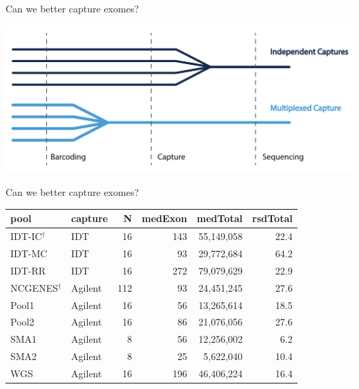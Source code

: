 \documentclass[
  10pt,
  ignorenonframetext,
  m]{beamer}
\begin{document}
\begin{frame}{Can we better capture exomes?}
\protect\hypertarget{can-we-better-capture-exomes}{}

\centering

\includegraphics{images/multiCapture.pdf}

\end{frame}

\begin{frame}{Can we better capture exomes?}
\protect\hypertarget{can-we-better-capture-exomes-1}{}

\centering

\begin{tabular}{llrrrr}
\toprule
pool & capture & N & medExon & medTotal & rsdTotal\\
\midrule
IDT-IC$^\dagger$ & IDT & 16 & 143 & 55,149,058 & 22.4\\
IDT-MC & IDT & 16 & 93 & 29,772,684 & 64.2\\
IDT-RR & IDT & 16 & 272 & 79,079,629 & 22.9\\
NCGENES$^\dagger$ & Agilent & 112 & 93 & 24,451,245 & 27.6\\
Pool1 & Agilent & 16 & 56 & 13,265,614 & 18.5\\
\addlinespace
Pool2 & Agilent & 16 & 86 & 21,076,056 & 27.6\\
SMA1 & Agilent & 8 & 56 & 12,256,002 & 6.2\\
SMA2 & Agilent & 8 & 25 & 5,622,040 & 10.4\\
WGS & Agilent & 16 & 196 & 46,406,224 & 16.4\\
\bottomrule
\end{tabular}

\end{frame}
\end{document}
